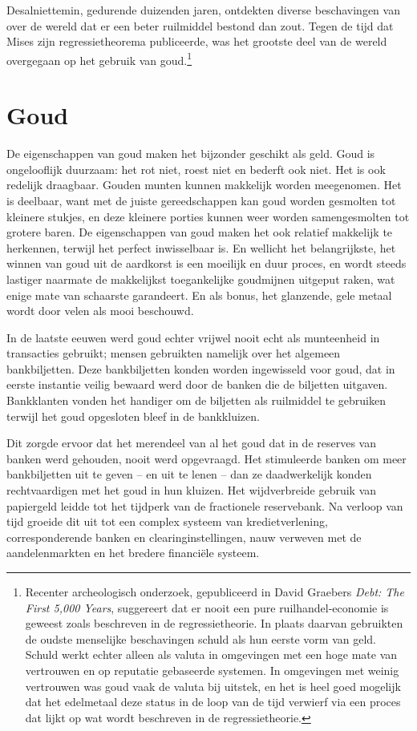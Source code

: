 \documentclass[
  a5paper,
  smalldemyvopaper,11pt,twoside,onecolumn,openright,extrafontsizes,
hidelinks]{memoir}
\begin{document}
Desalniettemin, gedurende duizenden jaren, ontdekten diverse
beschavingen van over de wereld dat er een beter ruilmiddel bestond dan
zout. Tegen de tijd dat Mises zijn regressietheorema publiceerde, was
het grootste deel van de wereld overgegaan op het gebruik van
goud.\footnote{Recenter archeologisch onderzoek, gepubliceerd in David
  Graebers \emph{Debt: The First 5,000 Years}, suggereert dat er nooit
  een pure ruilhandel-economie is geweest zoals beschreven in de
  regressietheorie. In plaats daarvan gebruikten de oudste menselijke
  beschavingen schuld als hun eerste vorm van geld. Schuld werkt echter
  alleen als valuta in omgevingen met een hoge mate van vertrouwen en op
  reputatie gebaseerde systemen. In omgevingen met weinig vertrouwen was
  goud vaak de valuta bij uitstek, en het is heel goed mogelijk dat het
  edelmetaal deze status in de loop van de tijd verwierf via een proces
  dat lijkt op wat wordt beschreven in de regressietheorie.}

\section{Goud}\label{goud}

De eigenschappen van goud maken het bijzonder geschikt als geld. Goud is
ongelooflijk duurzaam: het rot niet, roest niet en bederft ook niet. Het
is ook redelijk draagbaar. Gouden munten kunnen makkelijk worden
meegenomen. Het is deelbaar, want met de juiste gereedschappen kan goud
worden gesmolten tot kleinere stukjes, en deze kleinere porties kunnen
weer worden samengesmolten tot grotere baren. De eigenschappen van goud
maken het ook relatief makkelijk te herkennen, terwijl het perfect
inwisselbaar is. En wellicht het belangrijkste, het winnen van goud uit
de aardkorst is een moeilijk en duur proces, en wordt steeds lastiger
naarmate de makkelijkst toegankelijke goudmijnen uitgeput raken, wat
enige mate van schaarste garandeert. En als bonus, het glanzende, gele
metaal wordt door velen als mooi beschouwd.

In de laatste eeuwen werd goud echter vrijwel nooit echt als munteenheid
in transacties gebruikt; mensen gebruikten namelijk over het algemeen
bankbiljetten. Deze bankbiljetten konden worden ingewisseld voor goud,
dat in eerste instantie veilig bewaard werd door de banken die de
biljetten uitgaven. Bankklanten vonden het handiger om de biljetten als
ruilmiddel te gebruiken terwijl het goud opgesloten bleef in de
bankkluizen.

Dit zorgde ervoor dat het merendeel van al het goud dat in de reserves
van banken werd gehouden, nooit werd opgevraagd. Het stimuleerde banken
om meer bankbiljetten uit te geven -- en uit te lenen -- dan ze
daadwerkelijk konden rechtvaardigen met het goud in hun kluizen. Het
wijdverbreide gebruik van papiergeld leidde tot het tijdperk van de
fractionele reservebank. Na verloop van tijd groeide dit uit tot een
complex systeem van kredietverlening, corresponderende banken en
clearinginstellingen, nauw verweven met de aandelenmarkten en het
bredere financiële systeem.
\end{document}

